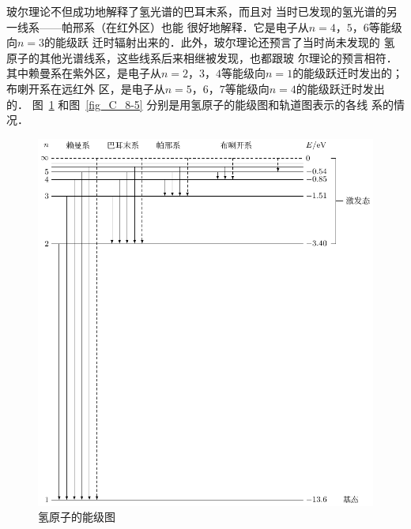 玻尔理论不但成功地解释了氢光谱的巴耳末系，而且对
当时已发现的氢光谱的另一线系——帕邢系（在红外区）也能
很好地解释．它是电子从$n=4 $，$ 5 $，$ 6$等能级向$n=3$的能级跃
迁时辐射出来的．此外，玻尔理论还预言了当时尚未发现的
氢原子的其他光谱线系，这些线系后来相继被发现，也都跟玻
尔理论的预言相符．其中赖曼系在紫外区，是电子从$n=2 $，$ 
3 $，$ 4$等能级向$n=1$的能级跃迁时发出的；布喇开系在远红外
区，是电子从$n=5 $，$ 6 $，$ 7$等能级向$n=4$的能级跃迁时发出的．
图~\ref{fig_C_8-4} 和图~\ref{fig_C_8-5} 分别是用氢原子的能级图和轨道图表示的各线
系的情况．
\begin{figure}[htbp]
    \centering
    \includegraphics{fig/C/8-4.pdf}
    \caption{氢原子的能级图}\label{fig_C_8-4}
\end{figure}

